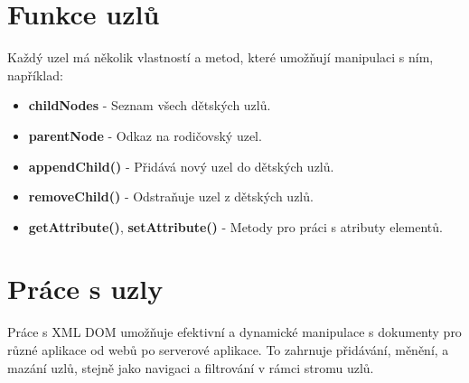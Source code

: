 \section{Funkce uzlů}
\label{sec:Funkce}

Každý uzel má několik vlastností a metod, které umožňují manipulaci s ním, například:

\begin{itemize}
  \item \textbf{childNodes} - Seznam všech dětských uzlů.
  \item \textbf{parentNode} - Odkaz na rodičovský uzel.
  \item \textbf{appendChild()} - Přidává nový uzel do dětských uzlů.
  \item \textbf{removeChild()} - Odstraňuje uzel z dětských uzlů.
  \item \textbf{getAttribute()}, \textbf{setAttribute()} - Metody pro práci s atributy elementů.
\end{itemize}

\section{Práce s uzly}
\label{sec:Prace}

Práce s XML DOM umožňuje efektivní a dynamické manipulace s dokumenty pro různé aplikace od webů po serverové aplikace. To zahrnuje přidávání, měnění, a mazání uzlů, stejně jako navigaci a filtrování v rámci stromu uzlů.
